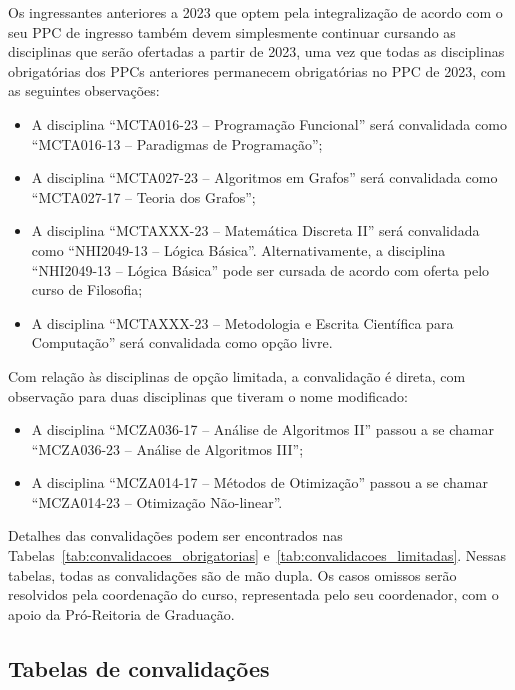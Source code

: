 \documentclass[a4paper]{article}
\begin{document}
Os ingressantes anteriores a 2023 que optem pela integralização de acordo com o
seu PPC de ingresso também devem simplesmente continuar cursando as disciplinas
que serão ofertadas a partir de 2023, uma vez que todas as disciplinas
obrigatórias dos PPCs anteriores permanecem obrigatórias no PPC de 2023, com as
seguintes observações:
\begin{itemize}
    \item A disciplina ``MCTA016-23 -- Programação Funcional'' será convalidada
    como ``MCTA016-13 -- Paradigmas de Programação'';
    \item A disciplina ``MCTA027-23 -- Algoritmos em Grafos'' será convalidada
    como ``MCTA027-17 -- Teoria dos Grafos'';
    \item A disciplina ``MCTAXXX-23 -- Matemática Discreta II'' será
    convalidada como ``NHI2049-13 -- Lógica Básica''.  Alternativamente, a
    disciplina ``NHI2049-13 -- Lógica Básica'' pode ser cursada de acordo com
    oferta pelo curso de Filosofia;
    \item A disciplina ``MCTAXXX-23 -- Metodologia e Escrita Científica para
    Computação'' será convalidada como opção livre.
\end{itemize}
Com relação às disciplinas de opção limitada, a convalidação é direta, com
observação para duas disciplinas que tiveram o nome modificado:
\begin{itemize}
    \item A disciplina ``MCZA036-17 -- Análise de Algoritmos II'' passou a se
    chamar ``MCZA036-23 -- Análise de Algoritmos III'';
    \item A disciplina ``MCZA014-17 -- Métodos de Otimização'' passou a se
    chamar ``MCZA014-23 -- Otimização Não-linear''.
\end{itemize}

Detalhes das convalidações podem ser encontrados nas
Tabelas~\ref{tab:convalidacoes_obrigatorias}
e~\ref{tab:convalidacoes_limitadas}. Nessas tabelas, todas as
convalidações são de mão dupla.
Os casos omissos serão resolvidos pela coordenação do curso, representada pelo
seu coordenador, com o apoio da Pró-Reitoria de Graduação.


\newpage

\subsection{Tabelas de convalidações}
\label{subsec:convalidacoes}
\end{document}
